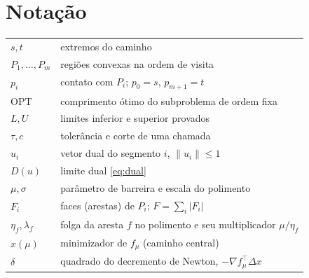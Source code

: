 \documentclass[11pt,a4paper]{article}
\theoremstyle{plain}\newtheorem{proposicao}{Proposição}
\theoremstyle{definition}\newtheorem{definicao}{Definição}
\theoremstyle{plain}\newtheorem{teorema}{Teorema}
\newcommand{\norm}[1]{\lVert#1\rVert}
\newcommand{\abs}[1]{\lvert#1\rvert}
\newcommand{\OPT}{\mathrm{OPT}}
\begin{document}
\section{Notação}
\begin{center}\small
\begin{tabular}{@{}ll@{}}\toprule
\(s,t\) & extremos do caminho\\
\(P_1,\dots,P_m\) & regiões convexas na ordem de visita\\
\(p_i\) & contato com \(P_i\); \(p_0=s\), \(p_{m+1}=t\)\\
\(\OPT\) & comprimento ótimo do subproblema de ordem fixa\\
\(L,U\) & limites inferior e superior provados\\
\(\tau,c\) & tolerância e corte de uma chamada\\
\(u_i\) & vetor dual do segmento \(i\), \(\norm{u_i}\le1\)\\
\(D(u)\) & limite dual \eqref{eq:dual}\\
\(\mu,\sigma\) & parâmetro de barreira e escala do polimento\\
\(F_i\) & faces (arestas) de \(P_i\); \(F=\sum_i\abs{F_i}\)\\
\(\eta_f,\lambda_f\) & folga da aresta \(f\) no polimento e seu multiplicador \(\mu/\eta_f\)\\
\(x(\mu)\) & minimizador de \(f_\mu\) (caminho central)\\
\(\delta\) & quadrado do decremento de Newton, \(-\nabla f_\mu^{\top}\Delta x\)\\\bottomrule
\end{tabular}
\end{center}
\end{document}
